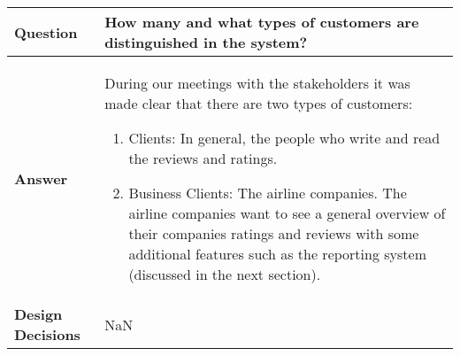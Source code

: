 \begin{longtable}{| l |  p{12cm} |}
\hline
\textbf{Question} & \textbf{How many and what types of customers are distinguished in the system?}  \\ \hline
\textbf{Answer} & During our meetings with the stakeholders it was made clear that there are two types of customers:
	\begin{enumerate} 
	\item Clients: In general, the people who write and read the reviews and ratings.
	\item Business Clients: The airline companies. The airline companies want to see a general overview of their companies ratings 			and reviews with some additional features such as the 
	reporting system (discussed in the next section).
	\end{enumerate} \\ \hline
\textbf{Design Decisions} & NaN \\ \hline
\end{longtable}
\clearpage

